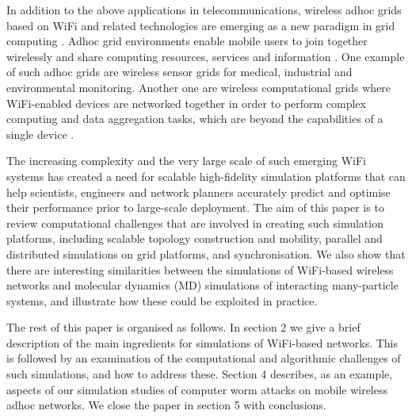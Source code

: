 \documentclass{elsart}
\begin{document}
In addition to the above applications in telecommunications, wireless 
adhoc grids based on WiFi and related technologies are emerging as a new 
paradigm in grid computing \cite{wgrid1,wgrid2}. Adhoc grid environments 
enable mobile users to join together wirelessly and share computing resources, 
services and information \cite{wgrid2}. One example  of such  adhoc grids 
are wireless sensor grids for medical, industrial and environmental 
monitoring. Another one are wireless computational 
grids where WiFi-enabled devices are networked 
together in order to perform complex computing and data aggregation tasks, 
which are beyond the capabilities of a single device
\cite{maziar-vgrid}.
 
The increasing complexity and the very large scale of such emerging WiFi
systems has created a need for scalable high-fidelity simulation  platforms that can help scientists, engineers and network planners accurately predict and 
optimise their performance prior to large-scale deployment.
The aim of this  paper is to review computational challenges that are 
involved in creating  such simulation platforms, including 
scalable topology construction and mobility, parallel and distributed 
simulations on grid platforms, 
and  synchronisation. We also show that there are 
interesting similarities between the simulations of 
WiFi-based wireless networks and molecular dynamics (MD) simulations of interacting many-particle systems, and illustrate 
how these could be exploited in practice.

The rest of this paper is organised as follows.  
In section 2 we give a brief description of the main 
ingredients for simulations of WiFi-based
networks. This is followed by an examination of the computational and 
algorithmic challenges  of such simulations, and how to 
address these. Section 4 describes, as an example,
aspects of our simulation studies  of computer worm attacks on 
mobile wireless adhoc networks. We close the paper in section 5 with 
conclusions.

\label{intro}
\end{document}

